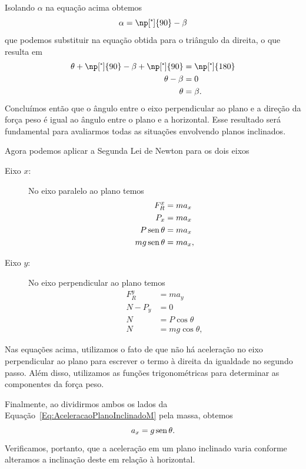 Isolando $\alpha$ na equação acima obtemos
\begin{equation}
    \alpha = \np[\tcdegree]{90} - \beta
\end{equation}
%
que podemos substituir na equação obtida para o triângulo da direita, o que resulta em
\begin{align}
        \theta + \np[\tcdegree]{90} - \beta + \np[\tcdegree]{90} &= \np[\tcdegree]{180} \\
        \theta - \beta &= 0 \\
        \theta &= \beta.
\end{align}
%
Concluímos então que o ângulo entre o eixo perpendicular ao plano e a direção da força peso é igual ao ângulo entre o plano e a horizontal. Esse resultado será fundamental para avaliarmos todas as situações envolvendo planos inclinados.

Agora podemos aplicar a Segunda Lei de Newton para os dois eixos
\begin{description}
    \item[Eixo $x$:] No eixo paralelo ao plano temos
        \begin{align}
            F_R^x &= m a_x \\
            P_x &= m a_x \\
            P \operatorname{sen}\theta &= m a_x \\
            mg \operatorname{sen}\theta &= ma_x,\label{Eq:AceleracaoPlanoInclinadoM}
        \end{align}
    \item[Eixo $y$:] No eixo perpendicular ao plano temos
        \begin{align}
            F_R^y &= m a_y \\
            N - P_y &= 0 \\
            N &= P \cos\theta \\
            N &= mg \cos\theta,
        \end{align}
\end{description}
%
Nas equações acima, utilizamos o fato de que não há aceleração no eixo perpendicular ao plano para escrever o termo à direita da igualdade no segundo passo. Além disso, utilizamos as funções trigonométricas para determinar as componentes da força peso.

Finalmente, ao dividirmos ambos os lados da Equação~\ref{Eq:AceleracaoPlanoInclinadoM} pela massa, obtemos
\begin{equation}
    a_x = g \operatorname{sen}\theta.
\end{equation}
%
Verificamos, portanto, que a aceleração em um plano inclinado varia conforme alteramos a inclinação deste em relação à horizontal.

